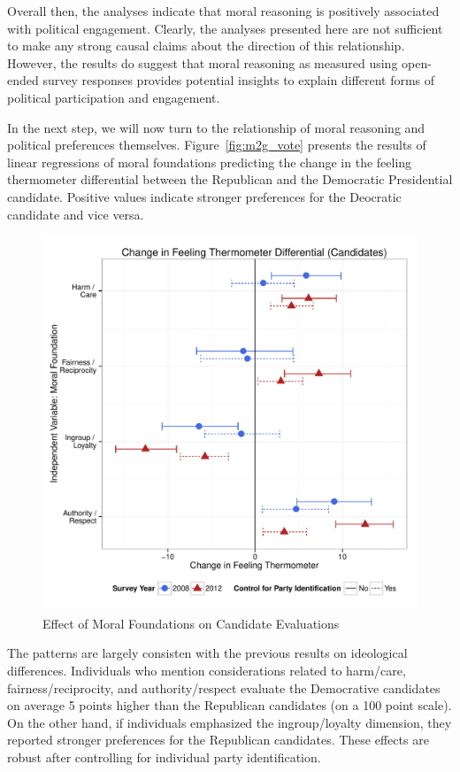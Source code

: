 \documentclass[12pt]{article}
\begin{document}
Overall then, the analyses indicate that moral reasoning is positively associated with political engagement. Clearly, the analyses presented here are not sufficient to make any strong causal claims about the direction of this relationship. However, the results do suggest that moral reasoning as measured using open-ended survey responses provides potential insights to explain different forms of political participation and engagement.

In the next step, we will now turn to the relationship of moral reasoning and political preferences themselves. Figure~\ref{fig:m2g_vote} presents the results of linear regressions of moral foundations predicting the change in the feeling thermometer differential between the Republican and the Democratic Presidential candidate. Positive values indicate stronger preferences for the Deocratic candidate and vice versa.

\begin{figure}[ht]\centering
\includegraphics[scale=.5]{../calc/fig/m2g_vote.pdf}
\caption{Effect of Moral Foundations on Candidate Evaluations}\label{fig:m2f_vote}
\end{figure}

The patterns are largely consisten with the previous results on ideological differences. Individuals who mention considerations related to harm/care, fairness/reciprocity, and authority/respect evaluate the Democrative candidates on average 5 points higher than the Republican candidates (on a 100 point scale). On the other hand, if individuals emphasized the ingroup/loyalty dimension, they reported stronger preferences for the Republican candidates. These effects are robust after controlling for individual party identification.
\end{document}

